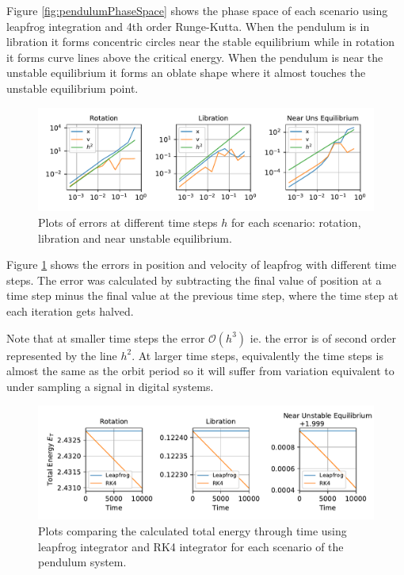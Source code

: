 Figure \ref{fig:pendulumPhaseSpace} shows the phase space of each scenario using leapfrog integration and 4th order Runge-Kutta. When the pendulum is in libration it forms concentric circles near the stable equilibrium while in rotation it forms curve lines above the critical energy. When the pendulum is near the unstable equilibrium it forms an oblate shape where it almost touches the unstable equilibrium point. 

\begin{figure}[ht!]
    \centering
    \includegraphics[width=\textwidth]{CodeAndFigures/PendulumErrorvsStepsize.pdf}
    \caption{Plots of errors at different time steps $h$ for each scenario: rotation, libration and near unstable equilibrium.}
    \label{fig:pendulumErrors}
\end{figure}

Figure \ref{fig:pendulumErrors} shows the errors in position and velocity of leapfrog with different time steps. The error was calculated by subtracting the final value of position at a time step minus the final value at the previous time step, where the time step at each iteration gets halved. 

Note that at smaller time steps the error $\mathcal{O}(h^3)$ ie. the error is of second order represented by the line $h^2$. At larger time steps, equivalently the time steps is almost the same as the orbit period so it will suffer from variation equivalent to under sampling a signal in digital systems.

\begin{figure}[ht!]
    \centering
    \includegraphics{CodeAndFigures/PendulumRK4vsLeapfrog.pdf}
    \caption{Plots comparing the calculated total energy through time using leapfrog integrator and RK4 integrator for each scenario of the pendulum system.}
    \label{fig:pendulumEnergy}
\end{figure}

